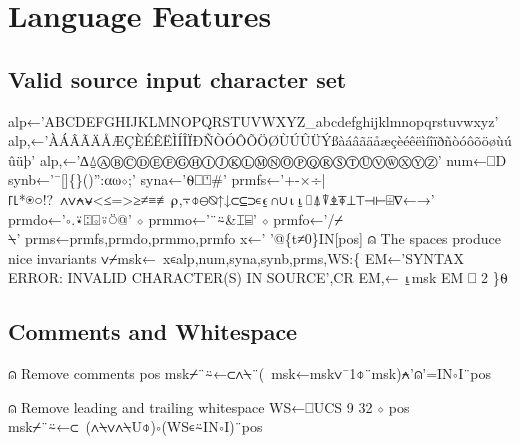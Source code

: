 \documentclass{article}%
\begin{document}
\section{Language Features}

\subsection{Valid source input character set}

\nwenddocs{}\endmoddef\nwstartdeflinemarkup{}\nwenddeflinemarkup
alp←'ABCDEFGHIJKLMNOPQRSTUVWXYZ_abcdefghijklmnopqrstuvwxyz'
alp,←'ÀÁÂÃÄÅÆÇÈÉÊËÌÍÎÏÐÑÒÓÔÕÖØÙÚÛÜÝßàáâãäåæçèéêëìíîïðñòóôõöøùúûüþ'
alp,←'∆⍙ⒶⒷⒸⒹⒺⒻⒼⒽⒾⒿⓀⓁⓂⓃⓄⓅⓆⓇⓈⓉⓊⓋⓌⓍⓎⓏ'
num←⎕D
synb←'¯[]\{\}()'':⍺⍵⋄;'
syna←'⍬⎕⍞#'
prmfs←'+-×÷|⌈⌊*⍟○!?~∧∨⍲⍱<≤=>≥≠≡≢⍴,⍪⌽⊖⍉↑↓⊂⊆⊃∊⍷∩∪⍳⍸⌷⍋⍒⍎⍕⊥⊤⊣⊢⌹∇←→'
prmdo←'∘.⍣⍠⌺⍤⍥@' ⋄ prmmo←'¨⍨&⌶⌸' ⋄ prmfo←'/⌿\\⍀'
prms←prmfs,prmdo,prmmo,prmfo
x←' '@\{t≠0\}IN[pos] ⍝ The spaces produce nice invariants
∨⌿msk←~x∊alp,num,syna,synb,prms,WS:\{
        EM←'SYNTAX ERROR: INVALID CHARACTER(S) IN SOURCE',CR
        EM,← ⍸msk
        EM ⎕ 2
\}⍬
\nwendcode{}\nwdocspar

\subsection{Comments and Whitespace}

\nwenddocs{}\endmoddef\nwstartdeflinemarkup{}\nwenddeflinemarkup
⍝ Remove comments
pos msk⌿¨⍨←⊂∧⍀¨(~msk←msk∨¯1⌽¨msk)⍲'⍝'=IN∘I¨pos

⍝ Remove leading and trailing whitespace
WS←⎕UCS 9 32 ⋄ pos msk⌿¨⍨←⊂~(∧⍀∨∧⍀U⌽)∘(WS∊⍨IN∘I)¨pos
\end{document}
